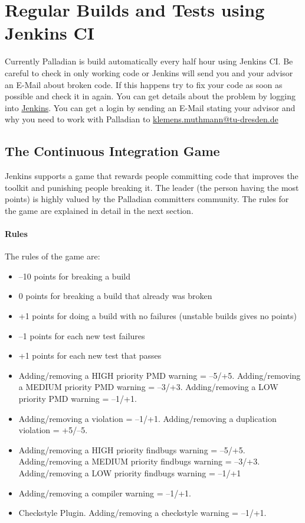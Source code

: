 \section{Regular Builds and Tests using Jenkins CI}
Currently Palladian is build automatically every half hour using Jenkins CI. Be careful to check in only working code or Jenkins will send you and your advisor an E-Mail about broken code. If this happens try to fix your code as soon as possible and check it in again. You can get details about the problem by logging into \href{http://www.effingo.de/jenkins}{Jenkins}. You can get a login by sending an E-Mail stating your advisor and why you need to work with Palladian to \href{mailto:klemens.muthmann@tu-dresden.de}{klemens.muthmann@tu-dresden.de}
\subsection{The Continuous Integration Game}
\label{sec:cigame}
Jenkins supports a game that rewards people committing code that improves the toolkit and punishing people breaking it. The leader (the person having the most points) is highly valued by the Palladian committers community. The rules for the game are explained in detail in the next section.
\paragraph{Rules}
The rules of the game are:
\begin{itemize}
\item --10 points for breaking a build
\item 0 points for breaking a build that already was broken
\item +1 points for doing a build with no failures (unstable builds gives no points)
\item --1 points for each new test failures
\item +1 points for each new test that passes
\item Adding/removing a HIGH priority PMD warning = --5/+5. Adding/removing a MEDIUM priority PMD warning = --3/+3. Adding/removing a LOW priority PMD warning = --1/+1.
\item Adding/removing a violation = --1/+1. Adding/removing a duplication violation = +5/--5.
\item Adding/removing a HIGH priority findbugs warning = --5/+5. Adding/removing a MEDIUM priority findbugs warning = --3/+3. Adding/removing a LOW priority findbugs warning = --1/+1
\item Adding/removing a compiler warning = --1/+1.
\item Checkstyle Plugin. Adding/removing a checkstyle warning = --1/+1.
\end{itemize}

